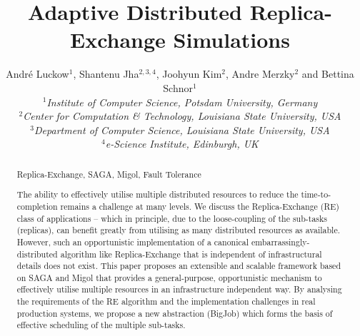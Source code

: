\documentclass{rspublic}
\title[Adaptive Distributed Replica-Exchange Simulations]{Adaptive Distributed
  Replica-Exchange Simulations}
\author[Luckow, Jha, Kim, Merzky, Schnor]{
  Andr\'e Luckow$^{1}$, Shantenu Jha$^{2,3,4}$, Joohyun Kim$^{2}$, Andre Merzky$^{2}$ and Bettina Schnor$^{1}$\\
  \small{\emph{$^{1}$Institute of Computer Science, Potsdam University, Germany}}\\
  \small{\emph{$^{2}$Center for Computation \& Technology, Louisiana State University, USA}}\\
  \small{\emph{$^{3}$Department of Computer Science, Louisiana State
      University, USA}}\\
  \small{\emph{$^{4}$e-Science Institute, Edinburgh, UK}}\\
}
\begin{document}
 


\maketitle    

\begin{abstract}{Replica-Exchange, SAGA, Migol, Fault Tolerance}  


  The ability to effectively utilise multiple distributed resources to
  reduce the time-to-completion remains a challenge at many levels.  We
  discuss the Replica-Exchange (RE) class of applications -- which in
  principle, due to the loose-coupling of the sub-tasks (replicas), can
  benefit greatly from utilising as many distributed resources as
  available.  However, such an opportunistic implementation of a
  canonical embarrassingly-distributed algorithm like Replica-Exchange
  that is independent of infrastructural details does not exist.  This
  paper proposes an extensible and scalable framework based on SAGA
  and Migol that provides a general-purpose, opportunistic mechanism
  to effectively utilise multiple resources in an infrastructure
  independent way. By analysing the requirements of the RE algorithm
  and the implementation challenges in real production systems, we
  propose a new abstraction (BigJob) which forms the basis of
  effective scheduling of the multiple sub-tasks. 




\end{abstract}
\end{document}
